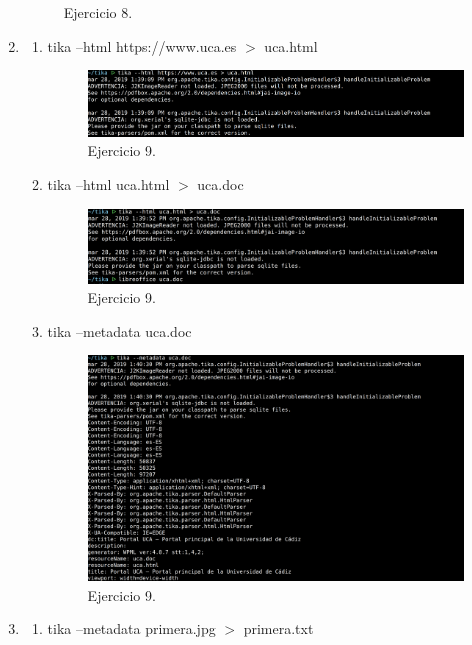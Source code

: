 \documentclass{article}
\begin{document}
\begin{enumerate}
\begin{figure}[H]
        \caption{Ejercicio 8.}
        \end{figure}
    \item
        \begin{enumerate}
            \item tika --html https://www.uca.es $>$ uca.html
                \begin{figure}[H]
                \centering
                \includegraphics[width=0.7\linewidth]{./ej14}
                \caption{Ejercicio 9.}
                \end{figure}
            \item tika --html uca.html $>$ uca.doc
                \begin{figure}[H]
                \centering
                \includegraphics[width=0.7\linewidth]{./ej15}
                \caption{Ejercicio 9.}
                \end{figure}
            \item tika --metadata uca.doc
                \begin{figure}[H]
                \centering
                \includegraphics[width=0.7\linewidth]{./ej16}
                \caption{Ejercicio 9.}
                \end{figure}
        \end{enumerate}
    \item
        \begin{enumerate}
            \item tika --metadata primera.jpg $>$ primera.txt
                \begin{figure}[H]

\end{figure}
\end{enumerate}
\end{enumerate}
\end{document}
